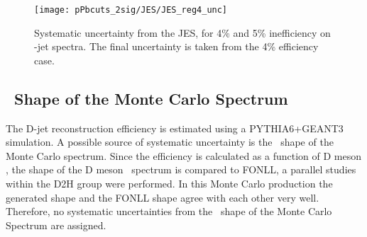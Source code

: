 \begin{figure}[bth]
\centering
\texttt{[image: pPbcuts\_2sig/JES/JES\_reg4\_unc]}
\caption{Systematic uncertainty from the JES, for 4\% and 5\% inefficiency on \Dzero-jet spectra. The final uncertainty is taken from the 4\% efficiency case. }
\label{fig:JESsys_Dzero}
\end{figure}


\subsection{\pt\ Shape of the Monte Carlo Spectrum}

The D-jet reconstruction efficiency is estimated using a PYTHIA6+GEANT3 simulation.
A possible source of systematic uncertainty is the \ptd\ shape of the Monte Carlo spectrum.
Since the efficiency is calculated as a function of D meson , the shape of the D meson \ptd\ spectrum is compared to FONLL, a parallel studies within the D2H group were performed. In this Monte Carlo production the generated shape and the FONLL shape agree with each other very well. Therefore, no systematic uncertainties from the \ptd\ shape of the Monte Carlo Spectrum are assigned.


